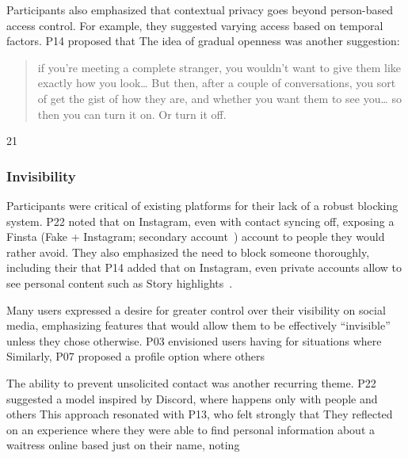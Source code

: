 Participants also emphasized that contextual privacy goes beyond person-based access control. For example, they suggested varying access based on temporal factors. P14 proposed that  The idea of gradual openness was another suggestion: \blockquote{if you're meeting a complete stranger, you wouldn't want to give them like exactly how you look\ldots{} But then, after a couple of conversations, you sort of get the gist of how they are, and whether you want them to see you\ldots{} so then you can turn it on. Or turn it off.}{21}


\subsubsection{Invisibility}
\label{lab:4-4-4}
Participants were critical of existing platforms for their lack of a robust blocking system. P22 noted that on Instagram, even with contact syncing off,  exposing a Finsta (Fake + Instagram; secondary account~\cite{VitakHuang-2022-FinstaAccounts-t}) account to people they would rather avoid. They also emphasized the need to block someone thoroughly, including their  that  P14 added that on Instagram, even private accounts allow  to see personal content such as Story highlights~\cite{story-highlights}.

Many users expressed a desire for greater control over their visibility on social media, emphasizing features that would allow them to be effectively ``invisible'' unless they chose otherwise. P03 envisioned users having  for situations where  Similarly, P07 proposed a  profile option where others  

The ability to prevent unsolicited contact was another recurring theme. P22 suggested a model inspired by Discord, where  happens only with people  and others  This approach resonated with P13, who felt strongly that  They reflected on an experience where they were able to find personal information about a waitress online based just on their name, noting 

